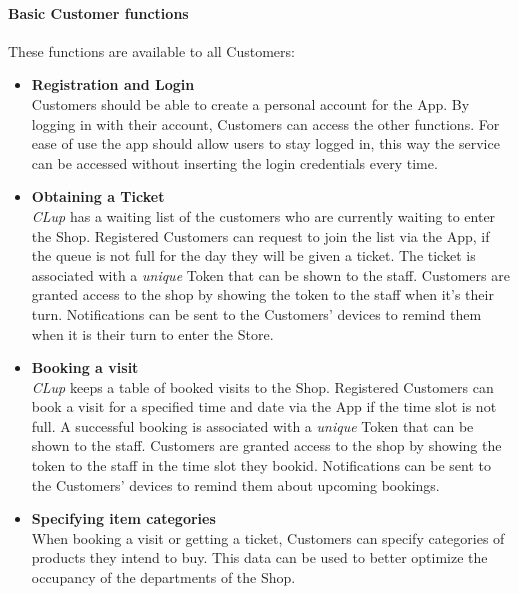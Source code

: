 \paragraph{Basic Customer functions} These functions are available to all Customers:
\begin{itemize}
    \item \textbf{Registration and Login}\\
          Customers should be able to create a personal account for the App. By logging in with their account, Customers can access the other functions. For ease of use the app should allow users to stay logged in, this way the service can be accessed without inserting the login credentials every time.
    \item \textbf{Obtaining a Ticket}\\
          \emph{CLup} has a waiting list of the customers who are currently waiting to enter the Shop. Registered Customers can request to join the list via the App, if the queue is not full for the day they will be given a ticket. The ticket is associated with a \emph{unique} Token that can be shown to the staff. Customers are granted access to the shop by showing the token to the staff when it's their turn. Notifications can be sent to the Customers' devices to remind them when it is their turn to enter the Store.
    \item \textbf{Booking a visit}\\
          \emph{CLup} keeps a table of booked visits to the Shop. Registered Customers can book a visit for a specified time and date via the App if the time slot is not full. A successful booking is associated with a \emph{unique} Token that can be shown to the staff. Customers are granted access to the shop by showing the token to the staff in the time slot they bookid. Notifications can be sent to the Customers' devices to remind them about upcoming bookings.
    \item \textbf{Specifying item categories}\\
          When booking a visit or getting a ticket, Customers can specify categories of products they intend to buy. This data can be used to better optimize the occupancy of the departments of the Shop.
\end{itemize}


